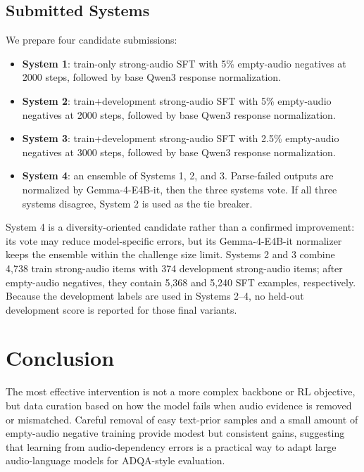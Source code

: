 \documentclass{article}
\begin{document}
\subsection{Submitted Systems}
We prepare four candidate submissions:
\begin{itemize}
    \item \textbf{System 1}: train-only strong-audio SFT with 5\% empty-audio negatives at 2000 steps, followed by base Qwen3 response normalization.
    \item \textbf{System 2}: train+development strong-audio SFT with 5\% empty-audio negatives at 2000 steps, followed by base Qwen3 response normalization.
    \item \textbf{System 3}: train+development strong-audio SFT with 2.5\% empty-audio negatives at 3000 steps, followed by base Qwen3 response normalization.
    \item \textbf{System 4}: an ensemble of Systems 1, 2, and 3. Parse-failed outputs are normalized by Gemma-4-E4B-it, then the three systems vote. If all three systems disagree, System 2 is used as the tie breaker.
\end{itemize}
System 4 is a diversity-oriented candidate rather than a confirmed improvement: its vote may reduce model-specific errors, but its Gemma-4-E4B-it normalizer keeps the ensemble within the challenge size limit.
Systems 2 and 3 combine 4,738 train strong-audio items with 374 development strong-audio items; after empty-audio negatives, they contain 5,368 and 5,240 SFT examples, respectively.
Because the development labels are used in Systems 2--4, no held-out development score is reported for those final variants.

\section{Conclusion}
\vspace{-10pt}
The most effective intervention is not a more complex backbone or RL objective, but data curation based on how the model fails when audio evidence is removed or mismatched.
Careful removal of easy text-prior samples and a small amount of empty-audio negative training provide modest but consistent gains, suggesting that learning from audio-dependency errors is a practical way to adapt large audio-language models for ADQA-style evaluation.



\end{document}
